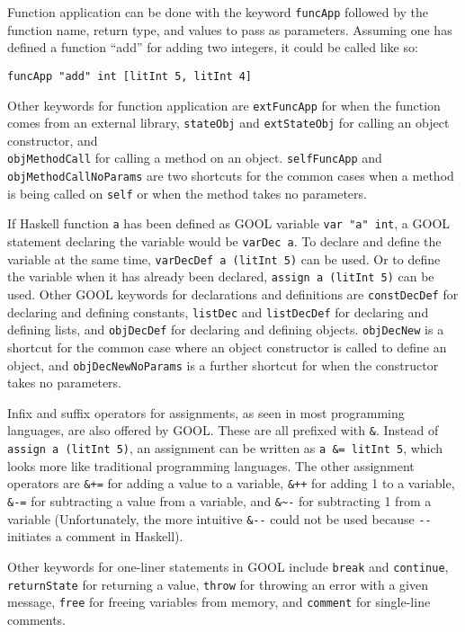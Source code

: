 \documentclass[sigplan,review,anonymous]{acmart}
\begin{document}
Function application can be done with the keyword \verb|funcApp| followed by 
the function name, return type, and values to pass as parameters. Assuming one 
has defined a function ``add'' for adding two integers, it could be called like 
so:
\begin{lstlisting}
funcApp "add" int [litInt 5, litInt 4]
\end{lstlisting}
Other keywords for function application are \verb|extFuncApp| for when the 
function comes from an external library, \verb|stateObj| and \verb|extStateObj| 
for calling an object constructor, and \\
\verb|objMethodCall| for calling a method on an object. \verb|selfFuncApp| and 
\verb|objMethodCallNoParams| are two shortcuts for the common cases when a 
method is being called on \verb|self| or when the method takes no parameters. 

If Haskell function \verb|a| has been defined as GOOL variable 
\verb|var "a" int|, a GOOL statement declaring the variable would be
\verb|varDec a|. To declare and define the variable at the same time,
\verb|varDecDef a (litInt 5)| can be used. Or to define the variable when it
has already been declared, \verb|assign a (litInt 5)| can be used. Other GOOL 
keywords for declarations and definitions are \verb|constDecDef| for declaring 
and defining constants, \verb|listDec| and \verb|listDecDef| for declaring and 
defining lists, and \verb|objDecDef| for declaring and defining objects. 
\verb|objDecNew| is a shortcut for the common case where an object constructor 
is called to define an object, and \verb|objDecNewNoParams| is a further 
shortcut for when the constructor takes no parameters.

Infix and suffix operators for assignments, as seen in most programming 
languages, are also offered by GOOL. These are all prefixed with \verb|&|. 
Instead of \verb|assign a (litInt 5)|, an assignment can be written as 
\verb|a &= litInt 5|, which looks more like traditional programming languages. 
The other assignment operators are \verb|&+=| for adding a value to a variable, 
\verb|&++| for adding 1 to a variable, \verb|&-=| for subtracting a value 
from a variable, and \verb|&~-| for subtracting 1 from a variable 
(Unfortunately, the more intuitive \verb|&--| could not be used because 
\verb|--| initiates a comment in Haskell).

Other keywords for one-liner statements in GOOL include \verb|break| and
\verb|continue|, \verb|returnState| for returning a value, \verb|throw| for
throwing an error with a given message, \verb|free| for freeing variables from
memory, and \verb|comment| for single-line comments.
 
\end{document}
